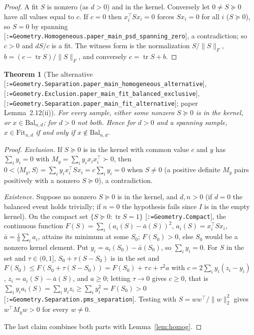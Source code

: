 \documentclass[11pt]{article}
\makeatletter
\newcommand{\formal@break}[1]{\@tfor\formal@tok:=#1\do{%
  \formal@tok
  \expandafter\ifx\formal@tok.\allowbreak\else
  \expandafter\ifx\formal@tok\_\allowbreak\fi\fi}}
\DeclareRobustCommand{\formal}[1]{\textnormal{[\texttt{\small\formal@break{#1}}]}}
\newcommand{\ip}[2]{\langle #1, #2\rangle}
\newcommand{\norm}[1]{\lVert #1\rVert}
\newcommand{\tr}{\operatorname{tr}}
\newcommand{\Fro}{F}
\newcommand{\Id}{I}
\newcommand{\Fit}{\mathrm{Fit}}
\newcommand{\Bal}{\mathrm{Bal}}
\theoremstyle{plain}
\newtheorem{theorem}{Theorem}[section]
\theoremstyle{definition}
\makeatother
\begin{document}
\begin{proof}
A fit $S$ is nonzero (as $d > 0$) and in the kernel. Conversely let
$0 \ne S \succeq 0$ have all values equal to $c$. If $c = 0$ then
$x_i^{\top}Sx_i = 0$ forces $Sx_i = 0$ for all $i$ ($S \succeq 0$), so $S = 0$
by spanning \formal{Geometry.Homogeneous.paper\_main\_psd\_spanning\_zero},
a contradiction; so $c > 0$ and $dS/c$ is a fit. The witness form is the
normalization $S/\norm{S}_\Fro$, $b = (c - \tr S)/\norm{S}_\Fro$, and
conversely $c = \tr S + b$.
\end{proof}

\begin{theorem}[The alternative \formal{Geometry.Separation.paper\_main\_homogeneous\_alternative}, \formal{Geometry.Exclusion.paper\_main\_fit\_balanced\_exclusive}, \formal{Geometry.Separation.paper\_main\_fit\_alternative}; paper Lemma~2.12(ii)]\label{thm:alternative}
For every sample, either some nonzero $S \succeq 0$ is in the kernel, or
$x \in \Bal_{n,d}$; for $d > 0$ not both. Hence for $d > 0$ and a spanning
sample, $x \in \Fit_{n,d}$ if and only if $x \notin \Bal_{n,d}$.
\end{theorem}

\begin{proof}
\emph{Exclusion.} If $S \succeq 0$ is in the kernel with common value $c$
and $y$ has $\sum_iy_i = 0$ with $M_y = \sum_iy_ix_ix_i^{\top} \succ 0$, then
$0 < \ip{M_y}{S} = \sum_iy_ix_i^{\top}Sx_i = c\sum_iy_i = 0$ when $S \ne 0$
(a positive definite $M_y$ pairs positively with a nonzero $S \succeq 0$),
a contradiction.

\emph{Existence.} Suppose no nonzero $S \succeq 0$ is in the kernel, and
$d, n > 0$ (if $d = 0$ the balanced event holds trivially; if $n = 0$ the
hypothesis fails since $\Id$ is in the empty kernel). On the compact set
$\{S \succeq 0 : \tr S = 1\}$ \formal{Geometry.Compact}, the continuous
function $F(S) = \sum_i(a_i(S) - \bar a(S))^2$, $a_i(S) = x_i^{\top}Sx_i$,
$\bar a = \frac1n\sum_ia_i$, attains its minimum at some $S_0$; $F(S_0) > 0$,
else $S_0$ would be a nonzero kernel element. Put $y_i = a_i(S_0) - \bar a(S_0)$,
so $\sum_iy_i = 0$. For $S$ in the set and $\tau \in (0, 1]$,
$S_0 + \tau(S - S_0)$ is in the set and
$F(S_0) \le F(S_0 + \tau(S - S_0)) = F(S_0) + \tau\,c + \tau^2a$ with
$c = 2\sum_iy_i(z_i - y_i)$, $z_i = a_i(S) - \bar a(S)$, and $a \ge 0$; letting
$\tau \to 0$ gives $c \ge 0$, that is $\sum_iy_ia_i(S) = \sum_iy_iz_i \ge \sum_iy_i^2 = F(S_0) > 0$
\formal{Geometry.Separation.pms\_separation}. Testing with $S = ww^{\top}/\norm{w}_2^2$
gives $w^{\top}M_yw > 0$ for every $w \ne 0$.

The last claim combines both parts with Lemma~\ref{lem:homog}.
\end{proof}
\end{document}
